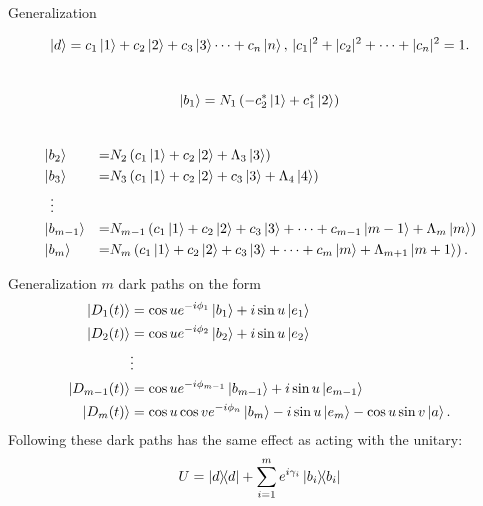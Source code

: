 \documentclass[t]{beamer}
\begin{document}
\begin{frame}{Generalization}

\begin{equation}
\ket{d} = c_1\ket{1} + c_2\ket{2} + c_3\ket{3} \dots + c_{n}\ket{n},\, |c_1|^2 + |c_2|^2 + \dots + |c_{n}|^2 = 1.
\end{equation}
\\
\begin{equation}
\ket{b_1} = N_1\left(-c_2^{*}\ket{1} + c_1^{*}\ket{2}\right)
\end{equation}
\\
\begin{equation}
\label{eq:birght_states}
\begin{aligned}
&\ket{b_2} &=& N_2 \left(c_1\ket{1} + c_2\ket{2} + \Lambda_3\ket{3}  \right)
\\
&\ket{b_3} &=&  N_3 \left(c_1\ket{1} + c_2\ket{2} + c_3\ket{3} + \Lambda_{4}\ket{4} \right)
\\
&\;\;\vdots
\\
&\ket{b_{m-1}} &=& N_{m-1} \left( c_1\ket{1} + c_2\ket{2} + c_3\ket{3}  + \dots + c_{m-1}\ket{m-1}+ \Lambda_m\ket{m} \right)
\\
&\ket{b_{m}} &=& N_m \left( c_1\ket{1} + c_2\ket{2} + c_3\ket{3}  + \dots + c_m\ket{m} + \Lambda_{m+1}\ket{m+1} \right).
\end{aligned}
\end{equation}

\end{frame}


\begin{frame}{Generalization}
$m$ dark paths on the form
\begin{equation}
\begin{aligned}
\ket{D_1(t)} &= \cos u e^{-i\phi_1}\ket{b_1} + i\sin u \ket{e_1}
\\
\ket{D_2(t)} &= \cos u e^{-i\phi_2}\ket{b_2} + i\sin u \ket{e_2}
\\
& \vdots
\\
\ket{D_{m-1}(t)} &= \cos u e^{-i\phi_{m-1}}\ket{b_{m-1}} + i\sin u \ket{e_{m-1}}
\\
\ket{D_m(t)} &= \cos u \cos v e^{-i\phi_n}\ket{b_m} - i\sin u \ket{e_m} - \cos u \sin v \ket{a}.
\end{aligned}
\end{equation}
Following these dark paths has the same effect as acting with the unitary:
\begin{equation}
U = \ketbra{d}{d} + \sum_{i = 1}^{m} e^{i\gamma_i} \ketbra{b_i}{b_i}
\end{equation}
\end{frame}
\end{document}
